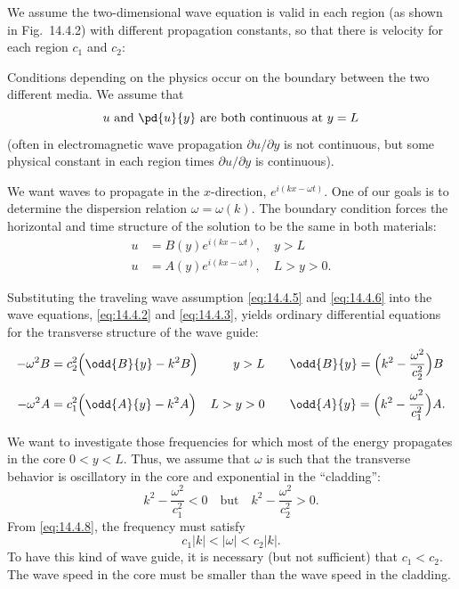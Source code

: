 We assume the two-dimensional wave equation is valid in each region (as shown in Fig.~14.4.2) with different propagation constants, so that there is velocity for each region $c_1$ and $c_2$:

Conditions depending on the physics occur on the boundary between the two different media.  We assume that
\begin{equation}
\label{eq:14.4.4}
u \text{ and } \pd{u}{y} \text{ are both continuous at } y = L
\end{equation}
(often in electromagnetic wave propagation $\partial u/\partial y$ is not continuous, but some physical constant in each region times $\partial u/\partial y$ is continuous).

We want waves to propagate in the $x$-direction, $e^{i(kx - \omega t)}$.  One of our goals is to determine the dispersion relation $\omega = \omega(k)$.  The boundary condition forces the horizontal and time structure of the solution to be the same in both materials:
\begin{align}
\label{eq:14.4.5}
u &= B(y)e^{i(kx - \omega t)}, \quad y > L \\
\label{eq:14.4.6}
u &= A(y)e^{i(kx - \omega t)}, \quad L > y > 0.
\end{align}

Substituting the traveling wave assumption \eqref{eq:14.4.5} and \eqref{eq:14.4.6} into the wave equations, \eqref{eq:14.4.2} and \eqref{eq:14.4.3}, yields ordinary differential equations for the transverse structure of the wave guide:
\begin{equation}
\label{eq:14.4.7}
\begin{aligned}
-\omega^2 B &= c_2^2\Bigl(\odd{B}{y} - k^2B\Bigr) & y > L &\qquad \odd{B}{y} = \Bigl(k^2 - \frac{\omega^2}{c_2^2}\Bigr)B \\[4pt]
-\omega^2 A &= c_1^2\Bigl(\odd{A}{y} - k^2A\Bigr) & L > y > 0 &\qquad \odd{A}{y} = \Bigl(k^2 - \frac{\omega^2}{c_1^2}\Bigr)A.
\end{aligned}
\end{equation}

We want to investigate those frequencies for which most of the energy propagates in the core $0 < y < L$.  Thus, we assume that $\omega$ is such that the transverse behavior is oscillatory in the core and exponential in the ``cladding'':
\begin{equation}
\label{eq:14.4.8}
k^2 - \frac{\omega^2}{c_1^2} < 0 \quad \text{but} \quad k^2 - \frac{\omega^2}{c_2^2} > 0.
\end{equation}
From \eqref{eq:14.4.8}, the frequency must satisfy
\[
c_1|k| < |\omega| < c_2|k|.
\]
To have this kind of wave guide, it is necessary (but not sufficient) that $c_1 < c_2$.  The wave speed in the core must be smaller than the wave speed in the cladding.

